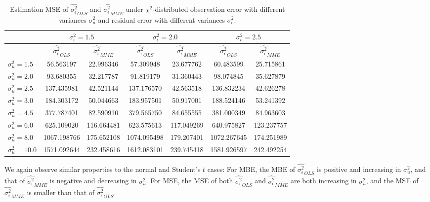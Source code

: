 \documentclass{article}
\begin{document}
\begin{table}[ht]
    \centering
    \caption{Estimation MSE of $\hat{\sigma^2_\epsilon}_{OLS}$ and $\hat{\sigma^2_\epsilon}_{MME}$ under $\chi^2$-distributed observation error with different variances $\sigma^2_u$ and residual error with different variances $\sigma^2_\epsilon$.}
    \label{Tab:MSE_sigma_chi}
    \begin{tabular}[t]{lcccccc}
        \hline
        &\multicolumn{2}{c}{$\sigma^2_\epsilon=1.5$}&\multicolumn{2}{c}{$\sigma^2_\epsilon=2.0$}&\multicolumn{2}{c}{$\sigma^2_\epsilon=2.5$}\\
        \hline
        &$\hat{\sigma^2_\epsilon}_{OLS}$&$\hat{\sigma^2_\epsilon}_{MME}$&$\hat{\sigma^2_\epsilon}_{OLS}$&
        $\hat{\sigma^2_\epsilon}_{MME}$&$\hat{\sigma^2_\epsilon}_{OLS}$&$\hat{\sigma^2_\epsilon}_{MME}$\\
        \hline
        $\sigma^2_u = 1.5$&56.563197&22.996346&57.309948&23.677762&60.483599&25.715861\\
        $\sigma^2_u = 2.0$&93.680355&32.217787&91.819179&31.360443&98.074845&35.627879\\
        $\sigma^2_u = 2.5$&137.435981&42.521144&137.176570&42.563518&136.832234&42.626278\\
        $\sigma^2_u = 3.0$&184.303172&50.044663&183.957501&50.917001&188.524146&53.241392\\
        $\sigma^2_u = 4.5$&377.787401&82.590910&379.565750&84.655555&381.000349&84.963603\\
        $\sigma^2_u = 6.0$&625.109020&116.664481&623.575613&117.049269&640.975827&123.237757\\
        $\sigma^2_u = 8.0$&1067.198766&175.652108&1074.095498&179.207401&1072.267645&174.251989\\
        $\sigma^2_u = 10.0$&1571.092644&232.458616&1612.083101&239.745418&1581.926597&242.492254\\ 
        \hline
    \end{tabular}
\end{table}

We again observe similar properties to the normal and Student's $t$ cases:
For MBE, the MBE of $\hat{\sigma^2_\epsilon}_{OLS}$ is positive and increasing in $\sigma^2_u$,
and that of $\hat{\sigma^2_\epsilon}_{MME}$ is negative and decreasing in $\sigma^2_u$. 
For MSE, the MSE of both $\hat{\sigma^2_\epsilon}_{OLS}$ and $\hat{\sigma^2_\epsilon}_{MME}$ are both increasing in $\sigma^2_u$, and the MSE of $\hat{\sigma^2_\epsilon}_{MME}$ is smaller than that of $\hat{\sigma^2_\epsilon}_{OLS}$. 
\end{document}
